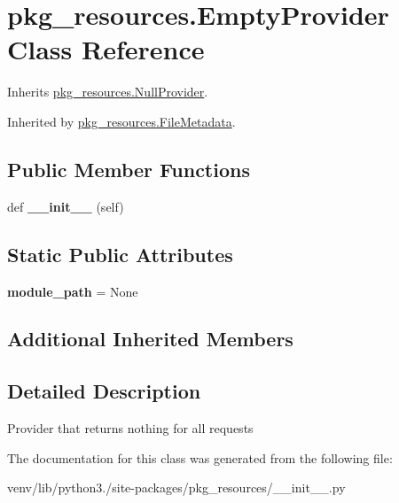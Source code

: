 \hypertarget{classpkg__resources_1_1_empty_provider}{}\section{pkg\+\_\+resources.\+Empty\+Provider Class Reference}
\label{classpkg__resources_1_1_empty_provider}


Inherits \hyperlink{classpkg__resources_1_1_null_provider}{pkg\+\_\+resources.\+Null\+Provider}.



Inherited by \hyperlink{classpkg__resources_1_1_file_metadata}{pkg\+\_\+resources.\+File\+Metadata}.

\subsection*{Public Member Functions}
\begin{DoxyCompactItemize}
\item 
\mbox{\label{classpkg__resources_1_1_empty_provider_a20ef7e9649edf4800dc02dbd50b5d410}} 
def {\bfseries \+\_\+\+\_\+init\+\_\+\+\_\+} (self)
\end{DoxyCompactItemize}
\subsection*{Static Public Attributes}
\begin{DoxyCompactItemize}
\item 
\mbox{\label{classpkg__resources_1_1_empty_provider_ab8ccb1251fac53b8648ceb34c8449d67}} 
{\bfseries module\+\_\+path} = None
\end{DoxyCompactItemize}
\subsection*{Additional Inherited Members}


\subsection{Detailed Description}
\begin{DoxyVerb}Provider that returns nothing for all requests\end{DoxyVerb}
 

The documentation for this class was generated from the following file\+:\begin{DoxyCompactItemize}
\item 
venv/lib/python3./site-\/packages/pkg\+\_\+resources/\+\_\+\+\_\+init\+\_\+\+\_\+.\+py\end{DoxyCompactItemize}
